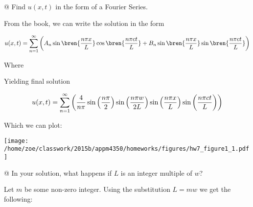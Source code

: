 \documentclass[10pt]{article}
\begin{document}
\begin{easylist}[enumerate]
    @ Find $u(x, t)$ in the form of a Fourier Series.

    From the book, we can write the solution in the form

    \[
        u(x, t) = \sum_{n=1}^\infty
            \pren{%
                A_n \sin\bren{\frac{n\pi x}{L}} \cos\bren{\frac{n\pi ct}{L}}
                    + B_n \sin\bren{\frac{n\pi x}{L}} \sin\bren{\frac{n\pi ct}{L}}
                }
    \]

    Where


    Yielding final solution

    \[
        u(x, t) = \sum_{n=1}^\infty
            \pren{%
                    \frac{4}{n\pi}\sin\pren{\frac{n\pi}{2}} \sin\pren{\frac{n\pi w}{2L}}
                    \sin\pren{\frac{n\pi x}{L}} \sin\pren{\frac{n\pi ct}{L}}
                }
    \]
    
    Which we can plot:

\simpleweave

\texttt{[image: /home/zoe/classwork/2015b/appm4350/homeworks/figures/hw7\_figure1\_1.pdf]}

\nosimpleweave

    @ In your solution, what happens if $L$ is an integer multiple of $w$?

    Let $m$ be some non-zero integer. Using the substitution $L = mw$ we get the following:



\end{easylist}
\end{document}
